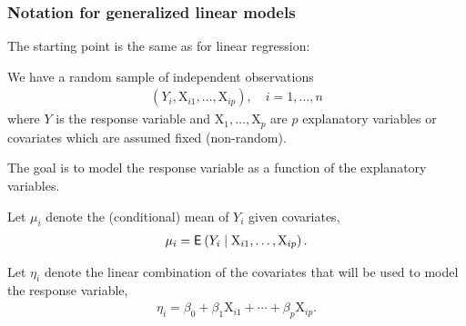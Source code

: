 \documentclass{beamer}
\begin{document}
\begin{frame}
\frametitle{Notation for generalized linear models}
\bi
\item The starting point is the same as for linear regression:
\bi
 
\item We have a random sample of independent observations 
\begin{align*}
(Y_i, \mathrm{X}_{i1}, \ldots, \mathrm{X}_{ip}), \quad i=1, \ldots, n
\end{align*}
where $Y$ is the response variable and $\mathrm{X}_1, \ldots, \mathrm{X}_p$ are $p$ explanatory variables or covariates which are assumed fixed (non-random).
\item The goal is to model the response variable as a function of the explanatory variables.
\ei
\item Let $\mu_i$ denote the (conditional) \alert{mean} of $Y_i$ given covariates,
\begin{align*}
\mu_i={\mathsf E}_{}\left(Y_i \mid  \mathrm{X}_{i1}, \ldots, \mathrm{X}_{ip}\right).
\end{align*}
\item Let $\eta_i$ denote the \alert{linear combination} of the covariates that will be used to model the response variable, 
\begin{align*}
\eta_i=\beta_0 + \beta_1 \mathrm{X}_{i1} + \cdots + \beta_p \mathrm{X}_{ip}.
\end{align*}
\ei
\end{frame}
\end{document}
